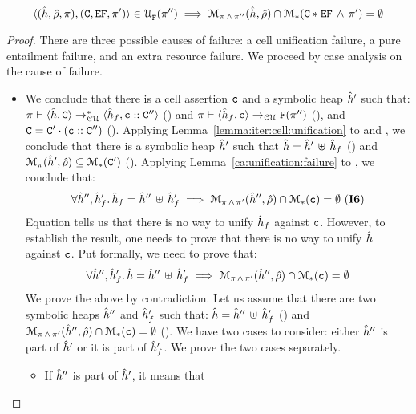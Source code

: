 \begin{lemma}
$$
\unificationfullfail{\sheap, \sstore, \pc}{\cells, \efs, \pfs'}{}{\pc''} 
%
 \implies \smodels{\sheap, \sstore}{\pc \, \wedge \, \pc''} \cap \sepmodels{\cells \sep \efs \, \wedge \, \pc'} = \emptyset
 $$
\end{lemma}
\begin{proof}
There are three possible causes of failure: a cell unification failure, a pure entailment failure, 
and an extra resource failure. We proceed by case analysis on the cause of failure. 
\vspace{6pt}
\begin{itemize}
    \item {} We conclude that there is a cell assertion $\cell$ 
              and a symbolic heap $\sheap'$ such that:  
              $\cellunificationiter{\sheap, \cells}{\sheap_f, \cell \lstcons \cells''}{\pc}$ () 
              and $\cellunificationx{\sheap_f, \cell}{\uno{\pc''}}{\pc}$ (), and  
              $\cells = \cells' \lstconcat (\cell \lstcons \cells'')$ (). Applying Lemma~\ref{lemma:iter:cell:unification}
              to  and , we conclude that there is a symbolic heap $\sheap'$ such that $\sheap = \sheap' \dunion \sheap_f$ ()
              and $\smodels{\sheap', \sstore}{\pc} \subseteq \sepmodels{\cells'}$ (). 
              Applying Lemma~\ref{ca:unification:failure} to , we conclude that: 
              $$
              	\forall \sheap'', \sheap_f' . \, \sheap_f = \sheap'' \dunion \sheap_f' \implies 
                     \smodels{\sheap'', \sstore}{\pc \, \wedge \, \pc'} \cap \sepmodels{\cell} = \emptyset \text{ (\ieq{6})}
              $$
              Equation  tells us that there is no way to unify $\sheap_f$ against $\cell$. However, to 
              establish the result, one needs to prove that there is no way to unify $\sheap$ against $\cell$. 
              Put formally, we need to prove that: 
              $$
              	\forall \sheap'', \sheap_f' . \, \sheap = \sheap'' \dunion \sheap_f' \implies 
                     \smodels{\sheap'', \sstore}{\pc \, \wedge \, \pc'} \cap \sepmodels{\cell} = \emptyset 
              $$
              We prove the above by contradiction. Let us assume that there are two symbolic heaps 
              $\sheap''$ and $\sheap_f'$ such that: $\sheap = \sheap'' \dunion \sheap_f'$ ()
              and $\smodels{\sheap'', \sstore}{\pc \, \wedge \, \pc'} \cap \sepmodels{\cell} = \emptyset$ (). 
              We have two cases to consider: either $\sheap''$ is part of $\sheap'$ or it is part of 
              $\sheap_f'$. We prove the two cases separately. 
              \begin{itemize}
                 \item If $\sheap''$ is part of $\sheap'$, it means that 
              \end{itemize}
              

\end{itemize}
\end{proof}

